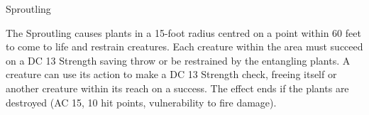 \begin{DndMonster}[width=0.5\textwidth]{Sproutling}
	
	\DndMonsterAttack[
      name=Vinewhip,
      distance=ranged, %
      mod=+4,
      range=40,
      targets=one target,
      dmg=\DndDice{2d4 + 2},
      dmg-type=slashing,
      extra={. If the target is medium or smaller, it is pulled 10 ft. and is grappled (escape DC 15 Strength Roll) if the Sproutling is not already grappling a creature. Until this grapple ends the target is pulled 10 ft. towards the Sproutling at the start of each of its turn},
    ]
    
	The Sproutling causes plants in a 15-foot radius centred on a point within 60 feet to come to life and restrain creatures. Each creature within the area must succeed on a DC 13 Strength saving throw or be restrained by the entangling plants. A creature can use its action to make a DC 13 Strength check, freeing itself or another creature within its reach on a success. The effect ends if the plants are destroyed (AC 15, 10 hit points, vulnerability to fire damage).
      
\end{DndMonster}
\vfill\eject
